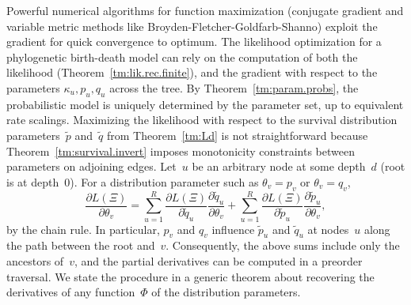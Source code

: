 \documentclass{elsarticle}
\newcommand{\nx}{u}
\newcommand{\ny}{v}
\newcommand{\fdf}{\Phi}
\begin{document}
Powerful numerical algorithms for 
function maximization (conjugate gradient and variable metric  
methods like Broyden-Fletcher-Goldfarb-Shanno)
exploit the gradient for quick convergence to optimum. 
The likelihood optimization for a phylogenetic birth-death model can rely 
on the computation of both the likelihood (Theorem~\ref{tm:lik.rec.finite}), 
and the gradient with respect to the parameters $\kappa_{\nx},p_{\nx},q_{\nx}$ 
across the tree. By Theorem~\ref{tm:param.probs}, the 
probabilistic model is uniquely determined by the parameter set, up to  
equivalent rate scalings.  
Maximizing the likelihood with respect to the survival 
distribution parameters~$\tilde{p}$ and~$\tilde{q}$ from Theorem~\ref{tm:Ld}
is not straightforward because Theorem~\ref{tm:survival.invert} imposes 
monotonicity constraints between parameters on adjoining edges.  
Let~$\nx$ be an arbitrary node at some depth~$d$ (root is at depth~0).  
For a distribution parameter 
such as $\theta_{\ny}=p_{\ny}$ or $\theta_{\ny}=q_{\ny}$,  
\[
\frac{\partial L(\Xi)}{\partial \theta_{\ny}}
	 = \sum_{\nx=1}^R 
		\frac{\partial L(\Xi)}{\partial \tilde{q}_{\nx}} \frac{\partial \tilde{q}_{\nx}}{\partial \theta_{\ny}}
		+ \sum_{\nx=1}^R 
		\frac{\partial L(\Xi)}{\partial \tilde{p}_{\nx}} \frac{\partial \tilde{p}_{\nx}}{\partial \theta_{\ny}},
\]
by the chain rule. 
In particular, $p_{\ny}$ and $q_{\ny}$ influence
$\tilde{p}_{\nx}$ and $\tilde{q}_{\nx}$ at nodes~$\nx$ 
along the path between the root and~$\ny$. Consequently, 
the above sums include only the ancestors of~$\ny$, and 
the partial derivatives can be computed in a preorder traversal.
We state the procedure in a generic theorem about 
recovering the derivatives of 
any function~$\fdf$ of the distribution parameters. 
\end{document}
